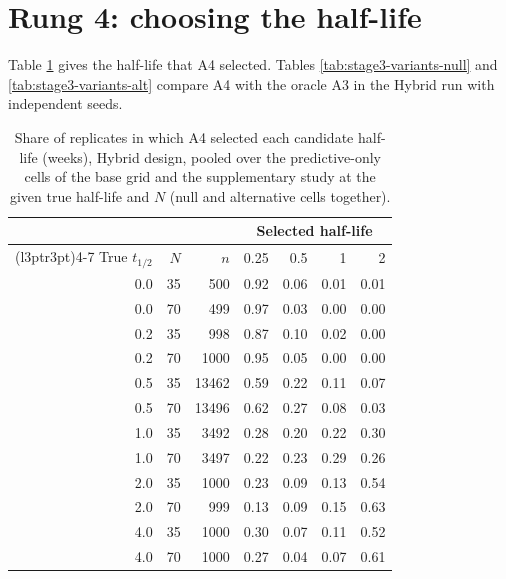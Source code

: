 \documentclass[
  11pt,
]{article}
\begin{document}
\section{Rung 4: choosing the half-life}\label{rung-4-choosing-the-half-life}

Table \ref{tab:stage3-selection} gives the half-life that A4
selected. Tables \ref{tab:stage3-variants-null} and
\ref{tab:stage3-variants-alt} compare A4 with the oracle A3 in the
Hybrid run with independent seeds.

\begin{table}
\centering
\caption{\label{tab:stage3-selection}Share of replicates in which A4 selected each candidate
    half-life (weeks), Hybrid design, pooled over the predictive-only
    cells of the base grid and the supplementary study at the given
    true half-life and $N$ (null and alternative cells together).}
\centering
\fontsize{9}{11}\selectfont
\begin{tabular}[t]{rrrrrrr}
\toprule
\multicolumn{3}{c}{ } & \multicolumn{4}{c}{Selected half-life} \\
\cmidrule(l{3pt}r{3pt}){4-7}
True $t_{1/2}$ & $N$ & $n$ & 0.25 & 0.5 & 1 & 2\\
\midrule
0.0 & 35 & 500 & 0.92 & 0.06 & 0.01 & 0.01\\
0.0 & 70 & 499 & 0.97 & 0.03 & 0.00 & 0.00\\
0.2 & 35 & 998 & 0.87 & 0.10 & 0.02 & 0.00\\
0.2 & 70 & 1000 & 0.95 & 0.05 & 0.00 & 0.00\\
0.5 & 35 & 13462 & 0.59 & 0.22 & 0.11 & 0.07\\
0.5 & 70 & 13496 & 0.62 & 0.27 & 0.08 & 0.03\\
1.0 & 35 & 3492 & 0.28 & 0.20 & 0.22 & 0.30\\
1.0 & 70 & 3497 & 0.22 & 0.23 & 0.29 & 0.26\\
2.0 & 35 & 1000 & 0.23 & 0.09 & 0.13 & 0.54\\
2.0 & 70 & 999 & 0.13 & 0.09 & 0.15 & 0.63\\
4.0 & 35 & 1000 & 0.30 & 0.07 & 0.11 & 0.52\\
4.0 & 70 & 1000 & 0.27 & 0.04 & 0.07 & 0.61\\
\bottomrule
\end{tabular}
\end{table}
\end{document}
